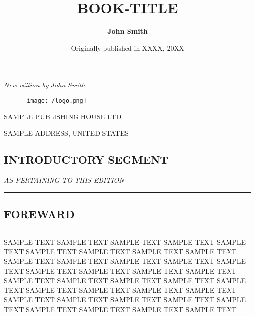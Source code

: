 \documentclass[a4paper,12pt,twoside]{book}
\author{\bf{John Smith}}
\title{\bf{BOOK-TITLE}}
\date{Originally published in XXXX, 20XX}
\begin{document}
\maketitle

\begin{center}
\emph{New edition by John Smith}

\end{center}



\begin{figure}[h!]
  \begin{center}
  \texttt{[image: /logo.png]} %
 \end{center}
\end{figure}

\begin{center}
SAMPLE PUBLISHING HOUSE LTD

SAMPLE ADDRESS, UNITED STATES
\end{center}

\newpage

\begin{center}
\section*{INTRODUCTORY SEGMENT}
\emph{AS PERTAINING TO THIS EDITION}
\end{center}
\vspace{5pt}
\hrule
\vspace{5pt}

\newpage

\newpage

\begin{center}
\section*{FOREWARD}
\hrule
\vspace{5pt}
\end{center}

SAMPLE TEXT SAMPLE TEXT SAMPLE TEXT SAMPLE TEXT SAMPLE TEXT SAMPLE TEXT SAMPLE TEXT SAMPLE TEXT SAMPLE TEXT SAMPLE TEXT SAMPLE TEXT SAMPLE TEXT SAMPLE TEXT SAMPLE TEXT SAMPLE TEXT SAMPLE TEXT SAMPLE TEXT SAMPLE TEXT SAMPLE TEXT SAMPLE TEXT SAMPLE TEXT SAMPLE TEXT SAMPLE TEXT SAMPLE TEXT SAMPLE TEXT SAMPLE TEXT SAMPLE TEXT SAMPLE TEXT SAMPLE TEXT SAMPLE TEXT SAMPLE TEXT SAMPLE TEXT SAMPLE TEXT SAMPLE TEXT SAMPLE TEXT SAMPLE TEXT 
\end{document}
